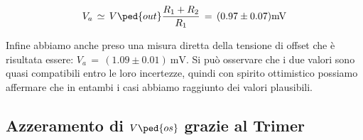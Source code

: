 \begin{equation}
	V_a\,\simeq\,V\ped{out}\frac{R_1+R_2}{R_1}\,=\, (0.97 \pm 0.07)\SI{}{\milli\volt}
\end{equation}

Infine abbiamo anche preso una misura diretta della tensione di offset che è risultata essere: $V_a\,=\,(1.09\pm0.01)\SI{}{\milli\volt}$. Si può osservare che i due valori sono quasi compatibili entro le loro incertezze, quindi con spirito ottimistico possiamo affermare che in entambi i casi abbiamo raggiunto dei valori plausibili.

\subsection*{Azzeramento di $V\ped{os}$ grazie al Trimer}

